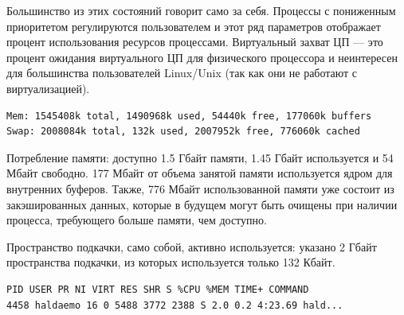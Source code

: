 \documentclass[10pt]{book}
\begin{document}
Большинство из этих состояний говорит само за себя. Процессы с пониженным приоритетом регулируются пользователем и этот ряд параметров отображает процент использования ресурсов процессами. Виртуальный захват ЦП — это процент ожидания виртуального ЦП для физического процессора и неинтересен для большинства пользователей Linux/Unix (так как они не работают с виртуализацией).

\vspace{3mm}
\begin{tcolorbox}
\begin{lstlisting}
Mem: 1545408k total, 1490968k used, 54440k free, 177060k buffers
Swap: 2008084k total, 132k used, 2007952k free, 776060k cached
\end{lstlisting}
\end{tcolorbox}


Потребление памяти: доступно 1.5 Гбайт памяти, 1.45 Гбайт используется и 54 Мбайт свободно. 177 Мбайт от объема занятой памяти используется ядром для внутренних буферов. Также, 776 Мбайт использованной памяти уже состоит из закэшированных данных, которые в будущем могут быть очищены при наличии процесса, требующего больше памяти, чем доступно.

Пространство подкачки, само собой, активно используется: указано 2 Гбайт пространства подкачки, из которых используется только 132 Кбайт.

\vspace{3mm}
\begin{tcolorbox}
\begin{lstlisting}
PID USER PR NI VIRT RES SHR S %CPU %MEM TIME+ COMMAND
4458 haldaemo 16 0 5488 3772 2388 S 2.0 0.2 4:23.69 hald...
\end{lstlisting}
\end{tcolorbox}
\end{document}
